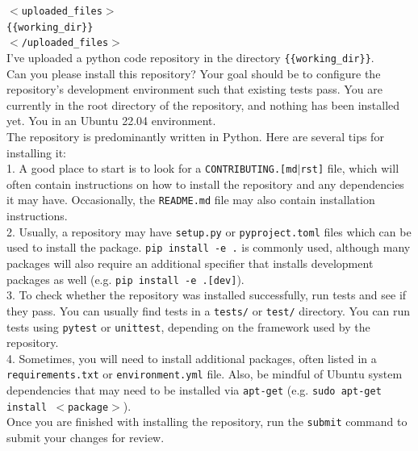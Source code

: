 \begin{example}
\small
\texttt{$<$uploaded\_files$>$} \\
\texttt{\{\{working\_dir\}\}} \\
\texttt{$<$/uploaded\_files$>$} \\
I've uploaded a python code repository in the directory \texttt{\{\{working\_dir\}\}}. \\

Can you please install this repository?
Your goal should be to configure the repository's development environment such that existing tests pass.
You are currently in the root directory of the repository, and nothing has been installed yet.
You in an Ubuntu 22.04 environment. \\

The repository is predominantly written in Python. Here are several tips for installing it: \\

1. A good place to start is to look for a \texttt{CONTRIBUTING.[md$\vert$rst]} file, which will often contain instructions on how to install the repository and any dependencies it may have. Occasionally, the \texttt{README.md} file may also contain installation instructions. \\

2. Usually, a repository may have \texttt{setup.py} or \texttt{pyproject.toml} files which can be used to install the package. \texttt{pip install -e .} is commonly used, although many packages will also require an additional specifier that installs development packages as well (e.g. \texttt{pip install -e .[dev]}). \\

3. To check whether the repository was installed successfully, run tests and see if they pass. You can usually find tests in a \texttt{tests/} or \texttt{test/} directory. You can run tests using \texttt{pytest} or \texttt{unittest}, depending on the framework used by the repository. \\

4. Sometimes, you will need to install additional packages, often listed in a \texttt{requirements.txt} or \texttt{environment.yml} file. Also, be mindful of Ubuntu system dependencies that may need to be installed via \texttt{apt-get} (e.g. \texttt{sudo apt-get install $<$package$>$}). \\

Once you are finished with installing the repository, run the \texttt{submit} command to submit your changes for review.
\end{example}
\label{fig:prompt_install_repo}